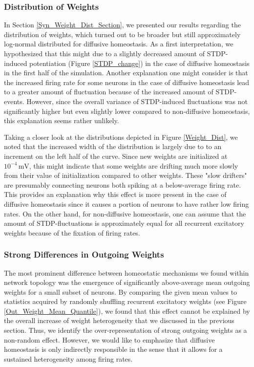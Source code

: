 \documentclass[10pt,a4paper]{article}
\begin{document}
\subsubsection{Distribution of Weights}
In Section \ref{Syn_Weight_Dist_Section}, we presented our results regarding the distribution of weights, which turned out to be broader but still approximately log-normal distributed for diffusive homeostasis. As a first interpretation, we hypothesized that this might due to a slightly decreased amount of STDP-induced potentiation (Figure \ref{STDP_change}) in the case of diffusive homeostasis in the first half of the simulation. Another explanation one might consider is that the increased firing rate for some neurons in the case of diffusive homeostasis lead to a greater amount of fluctuation because of the increased amount of STDP-events. However, since the overall variance of STDP-induced fluctuations was not significantly higher but even slightly lower compared to non-diffusive homeostasis, this explanation seems rather unlikely. 

Taking a closer look at the distributions depicted in Figure \ref{Weight_Dist}, we noted that the increased width of the distribution is largely due to to an increment on the left half of the curve. Since new weights are initialized at $\mathrm{10^{-4}\, mV}$, this might indicate that some weights are drifting much more slowly from their value of initialization compared to other weights. These "slow drifters" are presumably connecting neurons both spiking at a below-average firing rate.
This provides an explanation why this effect is more present in the case of diffusive homeostasis since it causes a portion of neurons to have rather low firing rates. On the other hand, for non-diffusive homeostasis, one can assume that the amount of STDP-fluctuations is approximately equal for all recurrent excitatory weights because of the fixation of firing rates.

\subsubsection{Strong Differences in Outgoing Weights}
The most prominent difference between homeostatic mechanisms we found within network topology was the emergence of significantly above-average mean outgoing weights for a small subset of neurons. By comparing the given mean values to statistics acquired by randomly shuffling recurrent excitatory weights (see Figure \ref{Out_Weight_Mean_Quantile}), we found that this effect cannot be explained by the overall increase of weight heterogeneity that we discussed in the previous section. Thus, we identify the over-representation of strong outgoing weights as a non-random effect. However, we would like to emphasize that diffusive homeostasis is only indirectly responsible in the sense that it allows for a sustained heterogeneity among firing rates.   
\end{document}
